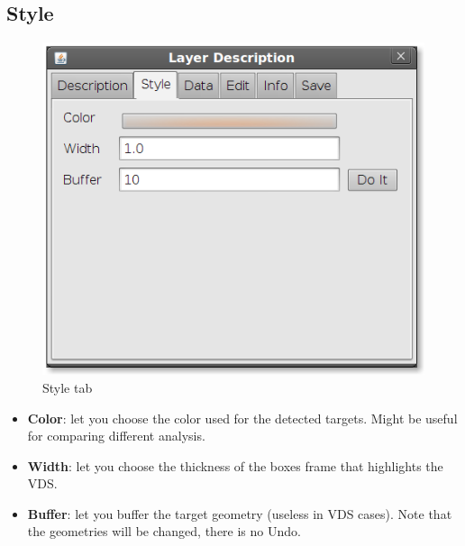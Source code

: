 \documentclass[12pt,a4paper,final]{report}
\begin{document}
\subsection{Style}
\begin{figure}[H]
 \centering
 \includegraphics[scale=0.45,keepaspectratio=true]{./images/VDS7.png}
 \caption{Style tab}
\end{figure}
\begin{itemize}
 \item \textbf{Color}: let you choose the color used for the detected targets. Might be useful for comparing different analysis.
 \item \textbf{Width}: let you choose the thickness of the boxes frame that highlights the VDS.
 \item \textbf{Buffer}: let you buffer the target geometry (useless in VDS cases). Note that the geometries will be changed, there is no Undo.
\end{itemize}
\end{document}
